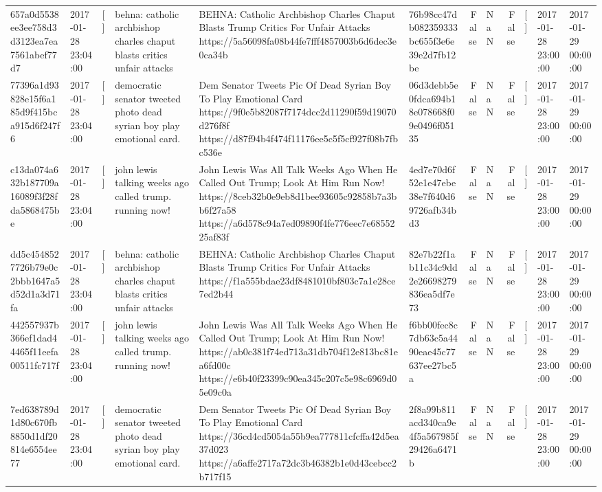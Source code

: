 \begin{tabular}{llllllrlrlll}
657a0d5538ee3ee758d3d3123ea7ea7561abef77d7 & 2017-01-28 23:04:00 & [] & behna: catholic archbishop charles chaput blasts critics unfair attacks & BEHNA: Catholic Archbishop Charles Chaput Blasts Trump Critics For Unfair Attacks https://5a56098fa08b44fe7fff4857003b6d6dec3e0ca34b & 76b98cc47db082359333bc655f3e6e39e2d7fb12be & False & NaN & False & [] & 2017-01-28 23:00:00 & 2017-01-29 00:00:00 \\
77396a1d93828e15f6a185d9f415bca915d6f247f6 & 2017-01-28 23:04:00 & [] & democratic senator tweeted photo dead syrian boy play emotional card. & Dem Senator Tweets Pic Of Dead Syrian Boy To Play Emotional Card https://9f0e5b82087f7174dcc2d11290f59d19070d276f8f https://d87f94b4f474f11176ee5c5f5cf927f08b7fbc536e & 06d3debb5e0fdca694b18e078668f09e0496f05135 & False & NaN & False & [] & 2017-01-28 23:00:00 & 2017-01-29 00:00:00 \\
c13da074a632b187709a16089f3f28fda5868475be & 2017-01-28 23:04:00 & [] & john lewis talking weeks ago called trump. running now! & John Lewis Was All Talk Weeks Ago When He Called Out Trump; Look At Him Run Now! https://8ceb32b0e9eb8d1bee93605c92858b7a3bb6f27a58 https://a6d578c94a7ed09890f4fe776eec7e6855225af83f & 4ed7e70d6f52e1e47ebe38e7f640d69726afb34bd3 & False & NaN & False & [] & 2017-01-28 23:00:00 & 2017-01-29 00:00:00 \\
dd5c4548527726b79e0c2bbb1647a5d52d1a3d71fa & 2017-01-28 23:04:00 & [] & behna: catholic archbishop charles chaput blasts critics unfair attacks & BEHNA: Catholic Archbishop Charles Chaput Blasts Trump Critics For Unfair Attacks https://f1a555bdae23df8481010bf803c7a1e28ce7ed2b44 & 82e7b22f1ab11c34c9dd2e26698279836ea5df7e73 & False & NaN & False & [] & 2017-01-28 23:00:00 & 2017-01-29 00:00:00 \\
442557937b366ef1dad44465f11eefa00511fc717f & 2017-01-28 23:04:00 & [] & john lewis talking weeks ago called trump. running now! & John Lewis Was All Talk Weeks Ago When He Called Out Trump; Look At Him Run Now! https://ab0c381f74ed713a31db704f12e813bc81ea6fd00c https://e6b40f23399c90ea345c207c5e98c6969d05e09c0a & f6bb00fec8c7db63c5a4490eae45c77637ee27bc5a & False & NaN & False & [] & 2017-01-28 23:00:00 & 2017-01-29 00:00:00 \\
7ed638789d1d80c670fb8850d1df20814e6554ee77 & 2017-01-28 23:04:00 & [] & democratic senator tweeted photo dead syrian boy play emotional card. & Dem Senator Tweets Pic Of Dead Syrian Boy To Play Emotional Card https://36cd4cd5054a55b9ea777811cfcffa42d5ea37d023 https://a6affe2717a72dc3b46382b1e0d43cebcc2b717f15 & 2f8a99b811acd340ca9e4f5a567985f29426a6471b & False & NaN & False & [] & 2017-01-28 23:00:00 & 2017-01-29 00:00:00 \\

\end{tabular}
